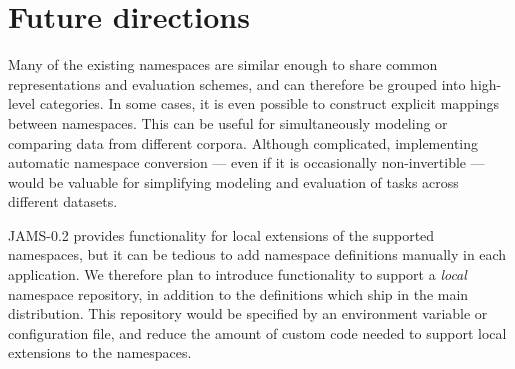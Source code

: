 \documentclass{article}
\begin{document}


\section{Future directions}\label{sec:future}

Many of the existing namespaces are similar enough to share common representations and evaluation schemes, and can therefore be grouped into high-level categories.
In some cases, it is even possible to construct explicit mappings between namespaces.  
This can be useful for simultaneously modeling or comparing data from different corpora.
Although complicated, implementing automatic namespace conversion --- even if it is occasionally non-invertible --- would be valuable for simplifying modeling and evaluation of tasks across different datasets.


JAMS-0.2 provides functionality for local extensions of the supported namespaces, but it can be tedious to add namespace definitions manually in each application.  
We therefore plan to introduce functionality to support a \emph{local} namespace repository, in addition to the definitions which ship in the main distribution.  
This repository would be specified by an environment variable or configuration file, and reduce the amount of custom code needed to support local extensions to the namespaces.


\end{document}
